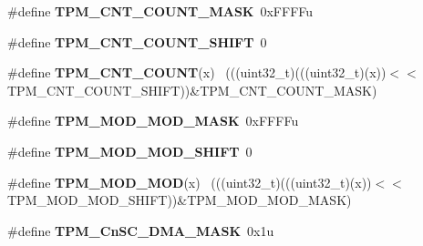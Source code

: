 \begin{DoxyCompactItemize}
\item 
\hypertarget{group___t_p_m___register___masks_gae4ca4e3ce211106290e584675dab1d28}{}\#define {\bfseries T\+P\+M\+\_\+\+C\+N\+T\+\_\+\+C\+O\+U\+N\+T\+\_\+\+M\+A\+S\+K}~0x\+F\+F\+F\+Fu\label{group___t_p_m___register___masks_gae4ca4e3ce211106290e584675dab1d28}

\item 
\hypertarget{group___t_p_m___register___masks_gabc68cb7f4dfd853021c35f9cad5b05e2}{}\#define {\bfseries T\+P\+M\+\_\+\+C\+N\+T\+\_\+\+C\+O\+U\+N\+T\+\_\+\+S\+H\+I\+F\+T}~0\label{group___t_p_m___register___masks_gabc68cb7f4dfd853021c35f9cad5b05e2}

\item 
\hypertarget{group___t_p_m___register___masks_ga6abbd5e59974bb79b28bda463b493a85}{}\#define {\bfseries T\+P\+M\+\_\+\+C\+N\+T\+\_\+\+C\+O\+U\+N\+T}(x)                                              ~(((uint32\+\_\+t)(((uint32\+\_\+t)(x))$<$$<$T\+P\+M\+\_\+\+C\+N\+T\+\_\+\+C\+O\+U\+N\+T\+\_\+\+S\+H\+I\+F\+T))\&T\+P\+M\+\_\+\+C\+N\+T\+\_\+\+C\+O\+U\+N\+T\+\_\+\+M\+A\+S\+K)\label{group___t_p_m___register___masks_ga6abbd5e59974bb79b28bda463b493a85}

\item 
\hypertarget{group___t_p_m___register___masks_ga547f0f1f80a59cf7a5c19b6e5ee66055}{}\#define {\bfseries T\+P\+M\+\_\+\+M\+O\+D\+\_\+\+M\+O\+D\+\_\+\+M\+A\+S\+K}~0x\+F\+F\+F\+Fu\label{group___t_p_m___register___masks_ga547f0f1f80a59cf7a5c19b6e5ee66055}

\item 
\hypertarget{group___t_p_m___register___masks_gad3b8c1cb94d29448d0eef30e94d65299}{}\#define {\bfseries T\+P\+M\+\_\+\+M\+O\+D\+\_\+\+M\+O\+D\+\_\+\+S\+H\+I\+F\+T}~0\label{group___t_p_m___register___masks_gad3b8c1cb94d29448d0eef30e94d65299}

\item 
\hypertarget{group___t_p_m___register___masks_gac77e8d5ff3f60a19aa8d0343d80130c0}{}\#define {\bfseries T\+P\+M\+\_\+\+M\+O\+D\+\_\+\+M\+O\+D}(x)                                                  ~(((uint32\+\_\+t)(((uint32\+\_\+t)(x))$<$$<$T\+P\+M\+\_\+\+M\+O\+D\+\_\+\+M\+O\+D\+\_\+\+S\+H\+I\+F\+T))\&T\+P\+M\+\_\+\+M\+O\+D\+\_\+\+M\+O\+D\+\_\+\+M\+A\+S\+K)\label{group___t_p_m___register___masks_gac77e8d5ff3f60a19aa8d0343d80130c0}

\item 
\hypertarget{group___t_p_m___register___masks_ga22ac77707a11ee299dc16d5a6b738739}{}\#define {\bfseries T\+P\+M\+\_\+\+Cn\+S\+C\+\_\+\+D\+M\+A\+\_\+\+M\+A\+S\+K}~0x1u\label{group___t_p_m___register___masks_ga22ac77707a11ee299dc16d5a6b738739}


\end{DoxyCompactItemize}
